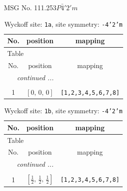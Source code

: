 \documentclass[fleqn,8pt]{jsarticle}
\begin{document}
\setcounter{MaxMatrixCols}{32}

\renewcommand{\tablename}{Table~}
\renewcommand{\figurename}{Figure~}
\begin{center}
\LARGE
MSG No. 111.253\quad$P\bar{4}'2'm$
\end{center}
\renewcommand{\arraystretch}{1.2}
\begin{longtable}{ccc}
\caption{Wyckoff site: {\tt 1a}, site symmetry: {\tt -4'2'm}}
 \\
 \hline \hline
No. & position & mapping \\ \hline \endfirsthead

\multicolumn{2}{l}{\tablename\ \thetable{}} \\
 \hline \hline
No. & position & mapping \\ \hline \endhead

 \hline \hline
\multicolumn{2}{r}{\footnotesize\it continued ...} \\ \endfoot

 \hline \hline
\multicolumn{2}{r}{} \\ \endlastfoot

1 & $\left[ 0,\, 0,\, 0 \right]$ & {\tt [1,2,3,4,5,6,7,8]} \\
\end{longtable}
\renewcommand{\arraystretch}{1.2}
\begin{longtable}{ccc}
\caption{Wyckoff site: {\tt 1b}, site symmetry: {\tt -4'2'm}}
 \\
 \hline \hline
No. & position & mapping \\ \hline \endfirsthead

\multicolumn{2}{l}{\tablename\ \thetable{}} \\
 \hline \hline
No. & position & mapping \\ \hline \endhead

 \hline \hline
\multicolumn{2}{r}{\footnotesize\it continued ...} \\ \endfoot

 \hline \hline
\multicolumn{2}{r}{} \\ \endlastfoot

1 & $\left[ \frac{1}{2},\, \frac{1}{2},\, \frac{1}{2} \right]$ & {\tt [1,2,3,4,5,6,7,8]} \\
\end{longtable}
\renewcommand{\arraystretch}{1.2}
\end{document}
